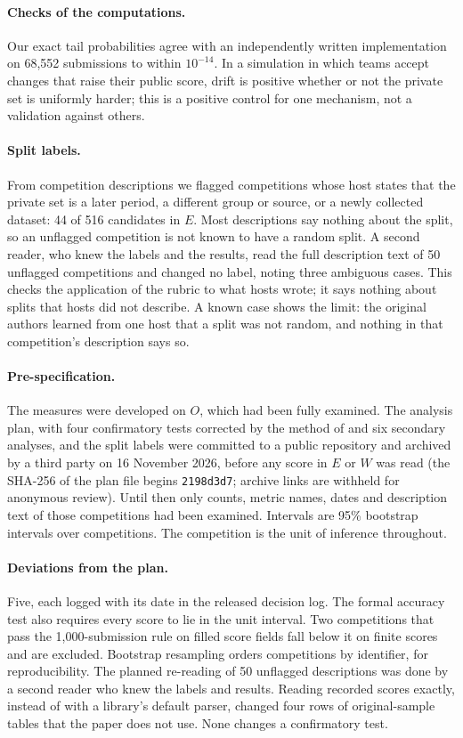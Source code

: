 \documentclass[10pt]{article}
\begin{document}
\paragraph{Checks of the computations.} Our exact tail probabilities agree with an independently written implementation on 68,552 submissions to within $10^{-14}$. In a simulation in which teams accept changes that raise their public score, drift is positive whether or not the private set is uniformly harder; this is a positive control for one mechanism, not a validation against others.

\paragraph{Split labels.} From competition descriptions we flagged competitions whose host states that the private set is a later period, a different group or source, or a newly collected dataset: 44 of 516 candidates in $E$. Most descriptions say nothing about the split, so an unflagged competition is not known to have a random split. A second reader, who knew the labels and the results, read the full description text of 50 unflagged competitions and changed no label, noting three ambiguous cases. This checks the application of the rubric to what hosts wrote; it says nothing about splits that hosts did not describe. A known case shows the limit: the original authors learned from one host that a split was not random, and nothing in that competition's description says so.

\paragraph{Pre-specification.} The measures were developed on $O$, which had been fully examined. The analysis plan, with four confirmatory tests corrected by the method of \citet{holm1979} and six secondary analyses, and the split labels were committed to a public repository and archived by a third party on 16 November 2026, before any score in $E$ or $W$ was read (the SHA-256 of the plan file begins \texttt{2198d3d7}; archive links are withheld for anonymous review). Until then only counts, metric names, dates and description text of those competitions had been examined. Intervals are 95\% bootstrap intervals over competitions. The competition is the unit of inference throughout.

\paragraph{Deviations from the plan.} Five, each logged with its date in the released decision log. The formal accuracy test also requires every score to lie in the unit interval. Two competitions that pass the 1,000-submission rule on filled score fields fall below it on finite scores and are excluded. Bootstrap resampling orders competitions by identifier, for reproducibility. The planned re-reading of 50 unflagged descriptions was done by a second reader who knew the labels and results. Reading recorded scores exactly, instead of with a library's default parser, changed four rows of original-sample tables that the paper does not use. None changes a confirmatory test.
\end{document}
